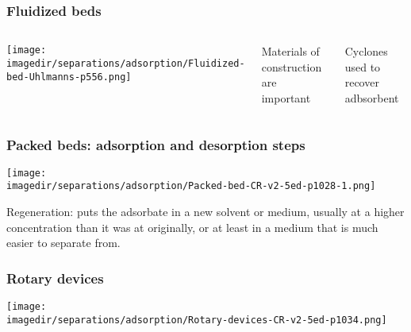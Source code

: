 \begin{frame}\frametitle{Fluidized beds}
	\begin{columns}[t]
			\begin{center}
				\texttt{[image: \\imagedir/separations/adsorption/Fluidized-bed-Uhlmanns-p556.png]}
			\end{center}
			\vspace{-18pt}
			Materials of construction are important
			
			\vspace{12pt}
			Cyclones used to recover adbsorbent
	\end{columns}
	
\end{frame}

\begin{frame}\frametitle{Packed beds: adsorption and desorption steps}
	\begin{center}
		\texttt{[image: \\imagedir/separations/adsorption/Packed-bed-CR-v2-5ed-p1028-1.png]}
	\end{center}
	
	Regeneration: puts the adsorbate in a new solvent or medium, usually at a higher concentration than it was at originally, or at least in a medium that is much easier to separate from.
\end{frame}

\begin{frame}\frametitle{Rotary devices}
	\begin{center}
		\texttt{[image: \\imagedir/separations/adsorption/Rotary-devices-CR-v2-5ed-p1034.png]}
	\end{center}
	\vspace{-12pt}
\end{frame}


